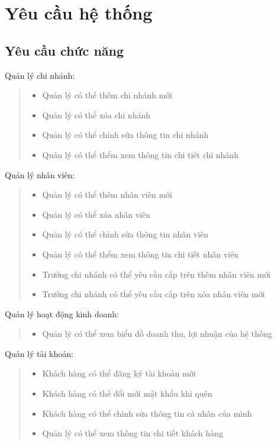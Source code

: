 \section{Yêu cầu hệ thống}
\subsection{Yêu cầu chức năng}
\hspace*{0.5cm}Quản lý chi nhánh:
\begin{quote}
    \begin{itemize}
        \item Quản lý có thể thêm chi nhánh mới
        \item Quản lý có thể xóa chi nhánh
        \item Quản lý có thể chỉnh sửa thông tin chi nhánh
        \item Quản lý có thể thểm xem thông tin chi tiết chi nhánh
    \end{itemize}
\end{quote}

Quản lý nhân viên:
\begin{quote}
    \begin{itemize}
        \item Quản lý có thể thêm nhân viên mới
        \item Quản lý có thể xóa nhân viên
        \item Quản lý có thể chỉnh sửa thông tin nhân viên
        \item Quản lý có thể thểm xem thông tin chi tiết nhân viên
        \item Trưởng chi nhánh có thể yêu cầu cấp trên thêm nhân viên mới
        \item Trưởng chi nhánh có thể yêu cầu cấp trên xóa nhân viên mới
    \end{itemize}
\end{quote}

Quản lý hoạt động kinh doanh:
\begin{quote}
    \begin{itemize}
        \item Quản lý có thể xem biểu đồ doanh thu, lợi nhuận của hệ thống
    \end{itemize}
\end{quote}

Quản lý tài khoản:
\begin{quote}
    \begin{itemize}
        \item Khách hàng có thể đăng ký tài khoản mới
        \item Khách hàng có thể đổi mới mật khẩu khi quên
        \item Khách hàng có thể chỉnh sửa thông tin cá nhân của mình
        \item Quản lý có thể xem thông tin chi tiết khách hàng
    \end{itemize}
\end{quote}

